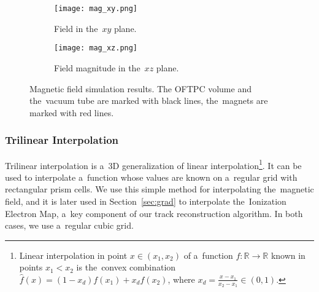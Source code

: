 			\begin{figure}
				\centering
				\begin{subfigure}[t]{0.45\textwidth}
					\centering
					\texttt{[image: mag\_xy.png]}
					\caption{Field in the~$xy$ plane.}
				\end{subfigure}
				\hfill
				\begin{subfigure}[t]{0.45\textwidth}
					\centering
					\texttt{[image: mag\_xz.png]}
					\caption{Field magnitude in the~$xz$ plane.}
				\end{subfigure}
				\caption{Magnetic field simulation results. The \ac{OFTPC} volume and the~vacuum tube are marked with black lines, the~magnets are marked with red lines.}
				\label{fig:mag}
			\end{figure}
		
			\subsubsection{Trilinear Interpolation}
			\label{sec:trilin}
				Trilinear interpolation is a~3D generalization of linear interpolation\footnote{Linear interpolation in point $x\in(x_1,x_2)$ of a~function $f\colon\mathbb{R}\to\mathbb{R}$ known in points $x_1 < x_2$ is the~convex combination $\widehat{f}(x) = (1-x_d)f(x_1)+x_d f(x_2)$, where $x_d = \frac{x-x_1}{x_2-x_1} \in (0,1)$.}. It can be used to interpolate a~function whose values are known on a~regular grid with rectangular prism cells. We use this simple method for interpolating the~magnetic field, and it is later used in Section~\ref{sec:grad} to interpolate the~Ionization Electron Map, a~key component of our track reconstruction algorithm. In both cases, we use a~regular cubic grid.
				
